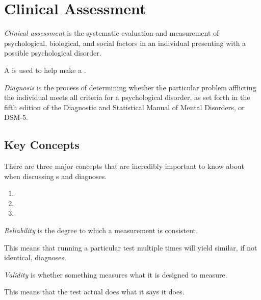 \section{Clinical Assessment}\label{sec:Clinical_Assessment}
\begin{definition}\label{def:Clinical_Assessment}
  \emph{Clinical assessment} is the systematic evaluation and measurement of psychological, biological, and social factors in an individual presenting with a possible psychological disorder.
\end{definition}

A  is used to help make a .

\begin{definition}[Diagnosis]\label{def:Diagnosis}
  \emph{Diagnosis} is the process of determining whether the particular problem afflicting the individual meets all criteria for a psychological disorder, as set forth in the fifth edition of the Diagnostic and Statistical Manual of Mental Disorders, or DSM-5.
\end{definition}

\subsection{Key Concepts}\label{subsec:Key_Clinical_Assessment_Concepts}
There are three major concepts that are incredibly important to know about when discussing s and diagnoses.

\begin{enumerate}[noitemsep]
\item {}
\item {}
\item {}
\end{enumerate}

\begin{definition}[Reliability]\label{def:Reliability}
  \emph{Reliability} is the degree to which a measurement is consistent.

  This means that running a particular test multiple times will yield similar, if not identical, diagnoses.
\end{definition}

\begin{definition}[Validity]\label{def:Validity}
  \emph{Validity} is whether something measures what it is designed to measure.

  This means that the test actual does what it says it does.
\end{definition}

